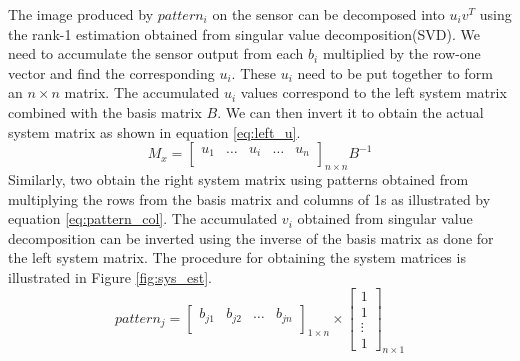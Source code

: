 The image produced by $pattern_i$ on the sensor can be decomposed into $u_iv^T$ using the rank-1 estimation obtained from singular value decomposition(SVD). We need to accumulate the sensor output from each $b_i$ multiplied by the row-one vector and find the corresponding $u_i$. These $u_i$ need to be put together to form an $n \times n$ matrix. The accumulated $u_i$ values correspond to the left system matrix combined with the basis matrix $B$. We can then invert it to obtain the actual system matrix as shown in equation \ref{eq:left_u}.
\begin{equation}
M_x = \begin{bmatrix} 
    u_{1} & \dots & u_i &  \dots & u_n \\
    \end{bmatrix}_{n\times n} B^{-1}
    \label{eq:left_u}
\end{equation}
Similarly, two obtain the right system matrix using patterns obtained from multiplying the rows from the basis matrix and columns of 1s as illustrated by equation \ref{eq:pattern_col}. The accumulated $v_i$ obtained from singular value decomposition can be inverted using the inverse of the basis matrix as done for the left system matrix. The procedure for obtaining the system matrices is illustrated in Figure \ref{fig:sys_est}.
\begin{equation}
pattern_{j} = \begin{bmatrix} 
    b_{j1} & b_{j2} & \dots &b_{jn}\\
    \end{bmatrix}_{1\times n}
    \times
    \begin{bmatrix} 
    1\\
    1\\
    \vdots\\
    1
    \end{bmatrix}_{n\times 1}
  \label{eq:pattern_col}
\end{equation}

